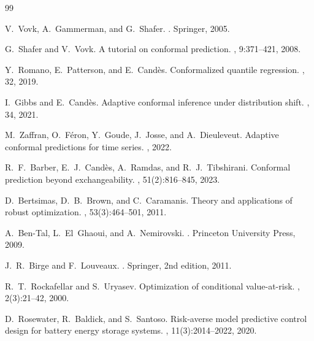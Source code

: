 \documentclass[11pt,a4paper]{article}
\begin{document}

\begin{thebibliography}{99}

V.~Vovk, A.~Gammerman, and G.~Shafer.
.
\newblock Springer, 2005.

G.~Shafer and V.~Vovk.
\newblock A tutorial on conformal prediction.
, 9:371--421, 2008.

Y.~Romano, E.~Patterson, and E.~Cand\`{e}s.
\newblock Conformalized quantile regression.
, 32, 2019.

I.~Gibbs and E.~Cand\`{e}s.
\newblock Adaptive conformal inference under distribution shift.
, 34, 2021.

M.~Zaffran, O.~F{\'e}ron, Y.~Goude, J.~Josse, and A.~Dieuleveut.
\newblock Adaptive conformal predictions for time series.
, 2022.

R.~F.~Barber, E.~J.~Cand\`{e}s, A.~Ramdas, and R.~J.~Tibshirani.
\newblock Conformal prediction beyond exchangeability.
, 51(2):816--845, 2023.

D.~Bertsimas, D.~B.~Brown, and C.~Caramanis.
\newblock Theory and applications of robust optimization.
, 53(3):464--501, 2011.

A.~Ben-Tal, L.~El~Ghaoui, and A.~Nemirovski.
.
\newblock Princeton University Press, 2009.

J.~R.~Birge and F.~Louveaux.
.
\newblock Springer, 2nd edition, 2011.

R.~T.~Rockafellar and S.~Uryasev.
\newblock Optimization of conditional value-at-risk.
, 2(3):21--42, 2000.

D.~Rosewater, R.~Baldick, and S.~Santoso.
\newblock Risk-averse model predictive control design for battery energy storage systems.
, 11(3):2014--2022, 2020.


\end{thebibliography}
\end{document}
